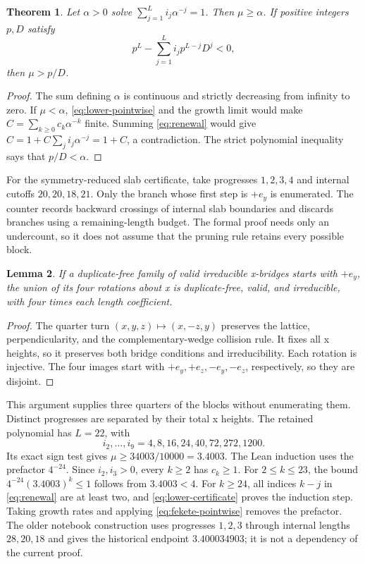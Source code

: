 \documentclass[conference]{IEEEtran}
\newtheorem{theorem}{Theorem}
\newtheorem{lemma}[theorem]{Lemma}
\begin{document}
\begin{theorem}\label{thm:renewal}
Let $\alpha>0$ solve $\sum_{j=1}^Li_j\alpha^{-j}=1$.
Then $\mu\geq\alpha$. If positive integers $p,D$ satisfy
\begin{equation}\label{eq:lower-certificate}
 p^L-\sum_{j=1}^Li_jp^{L-j}D^j<0,
\end{equation}
then $\mu>p/D$.
\end{theorem}
\begin{proof}
The sum defining $\alpha$ is continuous and strictly decreasing
from infinity to zero. If $\mu<\alpha$, \eqref{eq:lower-pointwise}
and the growth limit would make
$C=\sum_{k\geq0}c_k\alpha^{-k}$ finite.
Summing \eqref{eq:renewal} would give
$C=1+C\sum_ji_j\alpha^{-j}=1+C$, a contradiction.
The strict polynomial inequality says that $p/D<\alpha$.
\end{proof}

For the symmetry-reduced slab certificate, take progresses $1,2,3,4$ and internal
cutoffs $20,20,18,21$. Only the branch whose first step is $+e_y$
is enumerated. The counter records backward crossings of internal
slab boundaries and discards branches using a remaining-length budget.
The formal proof needs only an undercount, so it does not assume that
the pruning rule retains every possible block.

\begin{lemma}\label{lem:fourfold}
If a duplicate-free family of valid irreducible x-bridges starts with
$+e_y$, the union of its four rotations about x is duplicate-free,
valid, and irreducible, with four times each length coefficient.
\end{lemma}
\begin{proof}
The quarter turn $(x,y,z)\mapsto(x,-z,y)$ preserves the lattice,
perpendicularity, and the complementary-wedge collision rule. It
fixes all x heights, so it preserves both bridge conditions and
irreducibility. Each rotation is injective. The four images start
with $+e_y,+e_z,-e_y,-e_z$, respectively, so they are disjoint.
\end{proof}

This argument supplies three quarters of the blocks without
enumerating them. Distinct progresses are separated by their total
x heights. The retained polynomial has $L=22$, with
\[
 i_2,\ldots,i_9=4,8,16,24,40,72,272,1200.
\]
Its exact sign test gives $\mu\geq34003/10000=3.4003$.
The Lean induction uses the prefactor $4^{-24}$.
Since $i_2,i_3>0$, every $k\geq2$ has $c_k\geq1$.
For $2\leq k\leq23$, the bound
$4^{-24}(3.4003)^k\leq1$ follows from $3.4003<4$.
For $k\geq24$, all indices $k-j$ in \eqref{eq:renewal} are at
least two, and \eqref{eq:lower-certificate} proves the induction step.
Taking growth rates and applying \eqref{eq:fekete-pointwise}
removes the prefactor. The older notebook construction uses progresses
$1,2,3$ through internal lengths $28,20,18$ and gives the historical
endpoint $3.400034903$; it is not a dependency of the current proof.
\end{document}
